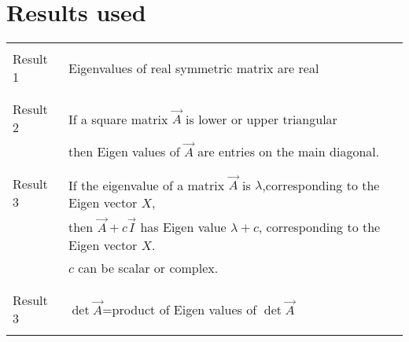 \documentclass[journal,12pt,twocolumn]{IEEEtran}
\begin{document}
\section{\textbf{Results used}}
\begin{table}[h!]
\begin{center}
\begin{tabular}{|p{2cm}|p{13cm}|}
\hline
&\\
Result 1 & Eigenvalues of real symmetric matrix are real\\
&\\
\hline
&\\
Result 2 & If a square matrix  $\vec{A}$ is lower or upper triangular\\& then Eigen values of $\vec{A}$ are  entries on the main diagonal.\\ 
&\\
\hline
&\\
Result 3 &If the eigenvalue of a matrix $\vec{A}$ is $\lambda $,corresponding to the Eigen vector $X$,\\&then
$\vec{A}+c\vec{I}$ has Eigen value $\lambda+c$, corresponding to the Eigen vector $X$.\\&$c$ can be scalar or complex.\\
&\\
\hline
&\\
Result 3&$\det\vec{A}$=product of Eigen values of $\det\vec{A}$\\
&\\
\hline
    \end{tabular}
    \end{center}
\end{table}
\newpage
\end{document}
